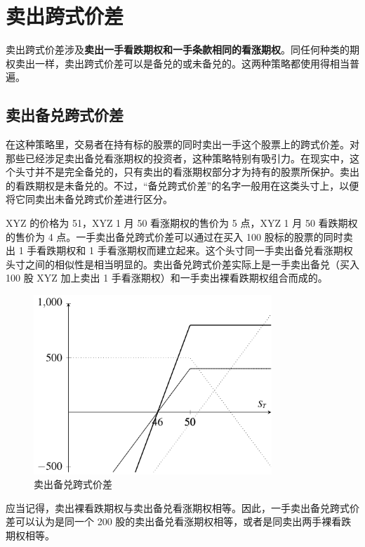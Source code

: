\chapter{卖出跨式价差\label{CH20}}
卖出跨式价差涉及\textbf{卖出一手看跌期权和一手条款相同的看涨期权}。同任何种类的期权卖出一样，卖出跨式价差可以是备兑的或未备兑的。这两种策略都使用得相当普遍。
\section{卖出备兑跨式价差}
在这种策略里，交易者在持有标的股票的同时卖出一手这个股票上的跨式价差。对那些已经涉足卖出备兑看涨期权的投资者，这种策略特别有吸引力。在现实中，这个头寸并不是完全备兑的，只有卖出的看涨期权部分才为持有的股票所保护。卖出的看跌期权是未备兑的。不过，“备兑跨式价差”的名字一般用在这类头寸上，以便将它同卖出未备兑跨式价差进行区分。
\begin{tcolorbox}
    XYZ 的价格为 51，XYZ 1 月 50 看涨期权的售价为 5 点，XYZ 1 月 50 看跌期权的售价为 4 点。一手卖出备兑跨式价差可以通过在买入 100 股标的股票的同时卖出 1 手看跌期权和 1 手看涨期权而建立起来。这个头寸同一手卖出备兑看涨期权头寸之间的相似性是相当明显的。卖出备兑跨式价差实际上是一手卖出备兑（买入 100 股 XYZ 加上卖出 1 手看涨期权）和一手卖出裸看跌期权组合而成的。
\end{tcolorbox}

\begin{figure}
    \begin{center}
        \includegraphics[width=0.8\textwidth]{IMG/fig20-1.pdf}
        \caption{卖出备兑跨式价差}
    \end{center}
\end{figure}

应当记得，卖出裸看跌期权与卖出备兑看涨期权相等。因此，一手卖出备兑跨式价差可以认为是同一个 200 股的卖出备兑看涨期权相等，或者是同卖出两手裸看跌期权相等。


